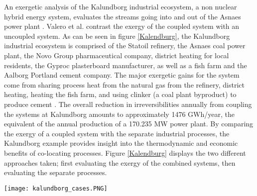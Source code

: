 An exergetic analysis of the Kalundborg industrial ecosystem, a non nuclear hybrid energy system, evaluates the streams going into and out of the Asnaes power plant \cite{Valero2012}.  Valero et al. contrast the exergy of the coupled system with an uncoupled system. As can be seen in figure \ref{Kalendburg}, the Kalundborg industrial ecosystem is comprised of the Statoil refinery, the Asnaes coal power plant, the Novo Group pharmaceutical company, district heating for local residents, the Gyproc plasterboard manufacturer, as well as a fish farm and the Aalborg Portland cement company. The major exergetic gains for the system come from sharing process heat from the natural gas from the refinery, district heating, heating the fish farm, and using clinker (a coal plant byproduct) to produce cement \cite{Valero2012}. The overall reduction in irreversibilities annually from coupling the systems at Kalundborg amounts to approximately 1476 GWh/year, the equivalent of the annual production of a 170.235 MW power plant. By comparing the exergy of a coupled system with the separate industrial processes, the Kalundborg example provides insight into the thermodynamic and economic benefits of co-locating processes. Figure \ref{Kalendburg} displays the two different approaches taken; first evaluating the exergy of the combined systems, then evaluating the separate processes.

\begin{figure*}
\centering
\texttt{[image: kalundborg\_cases.PNG]}
\caption{\small \sl This figure displays the two cases evaluated in Valero et al.: (a) shows the industrial ecosystem in the current coupled form and (b) shows the second case where there is no coupling.}
\label{Kalendburg}
\end{figure*}


